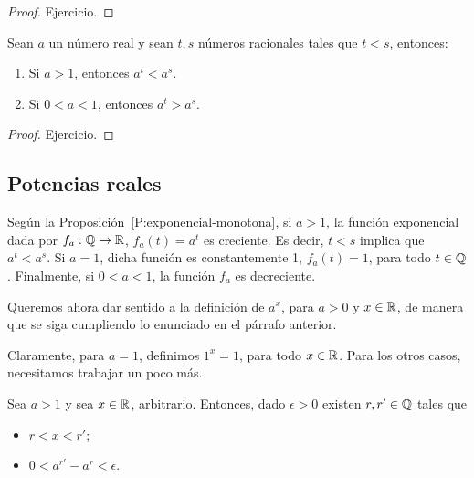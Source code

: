 \begin{proof}
    Ejercicio.
\end{proof}

\begin{proposition}\label{P:exponencial-monotona}
    Sean $a$ un número real y sean $t,s$ números racionales tales que $t<s$, entonces:
    \begin{enumerate}[{\rm (i)}]
        \item Si $a>1$, entonces $a^t < a^s$.
        \item Si $0<a<1$, entonces $a^t > a^s$.
    \end{enumerate}
\end{proposition}

\begin{proof}
    Ejercicio.
\end{proof}

\subsection{Potencias reales}

Según la Proposición~\ref{P:exponencial-monotona}, si $a>1$, la función exponencial dada por $f_a:\mathbb{Q}\to\mathbb{R}$, $f_a(t)= a^t$ es creciente. Es decir, $t<s$ implica que $a^t < a^s$. Si $a=1$, dicha función es constantemente 1, $f_a(t)=1$, para todo $t\in\mathbb{Q}$.
Finalmente, si $0<a<1$, la función $f_a$ es decreciente.

Queremos ahora dar sentido a la definición de $a^x$, para $a>0$ y $x\in\mathbb{R}$, de manera que se siga cumpliendo lo enunciado en el párrafo anterior.

Claramente, para $a=1$, definimos $1^x= 1$, para todo $x\in\mathbb{R}$.
Para los otros casos, necesitamos trabajar un poco más.

\begin{lemma}\label{L:exponencial-continuidad}
    Sea $a>1$ y sea $x\in\mathbb{R}$, arbitrario. 
    Entonces, dado $\epsilon>0$ existen $r,r'\in\mathbb{Q}$ tales que
    \begin{itemize}
        \item $r<x<r'$;
        \item $0<a^{r'} - a^{r} < \epsilon$.
    \end{itemize}
\end{lemma}

